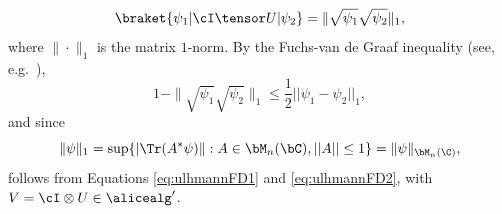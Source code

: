 \begin{equation} \label{eq:ulhmannFD1}
	\braket{\psi_1| \cI \tensor U |\psi_2} = \| \sqrt{\psi_1}\sqrt{\psi_2} \|_1,
\end{equation}
where $\|\cdot\|_1$ is the matrix $1$-norm. By the 
Fuchs-van de Graaf inequality (see, e.g.~\cite[Theorem 9.3.1]{wildeQuantumInformationTheory2013}),
\begin{equation}\label{eq:ulhmannFD2}
	1 -  \| \sqrt{\psi_1}\sqrt{\psi_2} \|_1 \leq \frac{1}{2} ||\psi_1 - \psi_2||_1,
\end{equation}
and since 
\begin{equation*}
	\| \psi \|_1 = \sup\{ |\Tr(A^* \psi)\| : A \in  \bM_n(\bC) ,||A|| \leq 1 \} = \|\psi\|_{\bM_n(\C)},
\end{equation*}
 follows from Equations \eqref{eq:ulhmannFD1} and \eqref{eq:ulhmannFD2}, with $V = \cI \otimes U \in \alicealg'$. 

